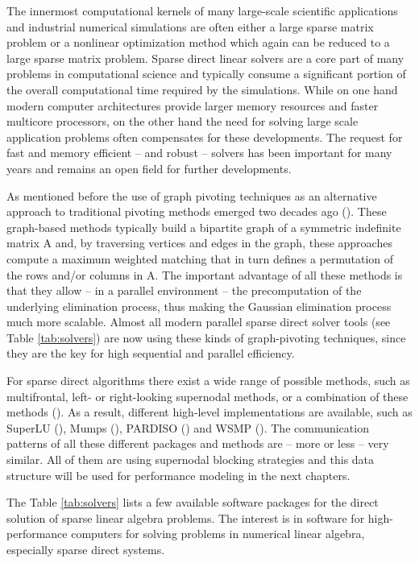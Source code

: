 The innermost computational kernels of many large-scale scientific applications and industrial numerical simulations are often either a large sparse matrix problem or a nonlinear optimization method which again can be reduced to a large sparse matrix problem. Sparse direct linear solvers are a core part of many problems in computational science and typically consume a significant portion of the overall computational time required by the simulations. While on one hand modern computer architectures provide larger memory resources and faster multicore processors, on the other hand the need for solving large scale application problems often compensates for these developments. The request for fast and memory efficient -- and robust -- solvers has been important for many years and remains an open field for further developments.

As mentioned before the use of graph pivoting techniques as an alternative approach to traditional pivoting methods emerged two decades ago (\cite{schenk-2004}). These graph-based methods
typically build a bipartite graph of a symmetric indefinite matrix A and, by traversing vertices and edges in the graph, these approaches compute a maximum weighted matching that
in turn defines a permutation of the rows and/or columns in A. The important advantage of
all these methods is that they allow -- in a parallel environment -- the precomputation of the
underlying elimination process, thus making the Gaussian elimination process much more
scalable. Almost all modern parallel sparse direct solver tools (see Table \ref{tab:solvers})
are now using these kinds of graph-pivoting techniques, since they are the key for high sequential and parallel efficiency.

For sparse direct algorithms there exist a wide range of possible methods, such as multifrontal, left- or right-looking supernodal methods, or a combination of these methods (\cite{davis:2006:dms}). As a result, different high-level implementations are available, such as SuperLU (\cite{superlu_dist}), Mumps (\cite{amestoy:2000:mpd}), PARDISO (\cite{schenk-2004,schenk-2006,Bollhofer2020}) and WSMP (\cite{gup02}). The communication patterns of all these different packages and methods are -- more or less -- very similar. All of them are using supernodal blocking strategies and this data structure will be used for performance modeling in the next chapters.

The Table \ref{tab:solvers} lists a few available software packages for the direct solution of sparse linear algebra problems. The interest is in software for high-performance computers for solving problems in numerical linear algebra, especially sparse direct systems.

